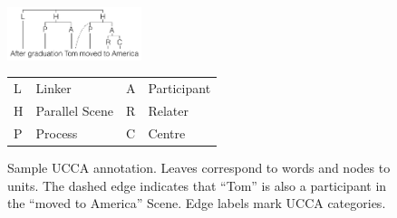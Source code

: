 \documentclass[11pt,letterpaper]{article}
\begin{document}
%


\begin{figure}
    \begin{center}
    \includegraphics[width=0.35\textwidth]{ucca-tree-v3.png}

{\small
  \begin{tabular}{|l|l|l|l|}
\hline
L & Linker &  A & Participant \\
H & Parallel Scene & R & Relater \\
P & Process & C & Centre \\
\hline
\end{tabular}
}
    \end{center}
\caption{\label{fig:ucca_example_v2}
  Sample UCCA annotation. Leaves correspond to words and nodes to units.
  The dashed edge indicates that ``Tom'' is also a participant in the ``moved to America''
  Scene. Edge labels mark UCCA categories.}
\end{figure}
\end{document}
